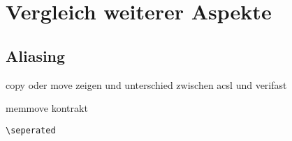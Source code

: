 ﻿\chapter{Vergleich weiterer Aspekte}


\section{Aliasing}

copy oder move zeigen und unterschied zwischen acsl und verifast

memmove kontrakt

\lstinline{\seperated}

